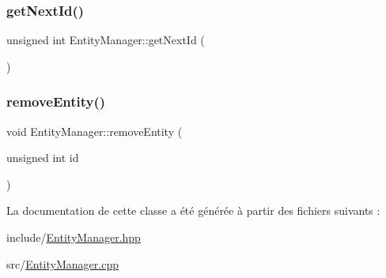 \subsubsection{\texorpdfstring{get\+Next\+Id()}{getNextId()}}
{\footnotesize\ttfamily unsigned int Entity\+Manager\+::get\+Next\+Id (\begin{DoxyParamCaption}{ }\end{DoxyParamCaption})}

\mbox{\label{classEntityManager_a2020094cd37ee4d48320c48c030b7053}} 
\subsubsection{\texorpdfstring{remove\+Entity()}{removeEntity()}}
{\footnotesize\ttfamily void Entity\+Manager\+::remove\+Entity (\begin{DoxyParamCaption}\item[{unsigned int}]{id }\end{DoxyParamCaption})}



La documentation de cette classe a été générée à partir des fichiers suivants \+:\begin{DoxyCompactItemize}
\item 
include/\hyperlink{EntityManager_8hpp}{Entity\+Manager.\+hpp}\item 
src/\hyperlink{EntityManager_8cpp}{Entity\+Manager.\+cpp}\end{DoxyCompactItemize}
